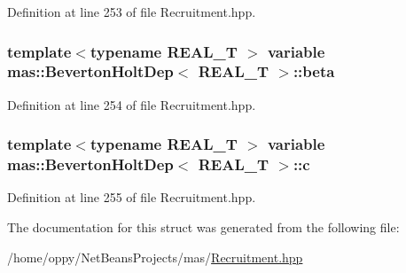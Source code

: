 Definition at line 253 of file Recruitment.\-hpp.

\hypertarget{structmas_1_1_beverton_holt_dep_a35104d09d811c33f724b94dcad050916}{
\subsubsection[{beta}]{\setlength{\rightskip}{0pt plus 5cm}template$<$typename R\-E\-A\-L\-\_\-\-T $>$ {\bf variable} {\bf mas\-::\-Beverton\-Holt\-Dep}$<$ R\-E\-A\-L\-\_\-\-T $>$\-::beta}}\label{structmas_1_1_beverton_holt_dep_a35104d09d811c33f724b94dcad050916}


Definition at line 254 of file Recruitment.\-hpp.

\hypertarget{structmas_1_1_beverton_holt_dep_abe85a3970eb878c0c5fd0f2a4027bb10}{
\subsubsection[{c}]{\setlength{\rightskip}{0pt plus 5cm}template$<$typename R\-E\-A\-L\-\_\-\-T $>$ {\bf variable} {\bf mas\-::\-Beverton\-Holt\-Dep}$<$ R\-E\-A\-L\-\_\-\-T $>$\-::c}}\label{structmas_1_1_beverton_holt_dep_abe85a3970eb878c0c5fd0f2a4027bb10}


Definition at line 255 of file Recruitment.\-hpp.



The documentation for this struct was generated from the following file\-:\begin{DoxyCompactItemize}
\item 
/home/oppy/\-Net\-Beans\-Projects/mas/\hyperlink{_recruitment_8hpp}{Recruitment.\-hpp}\end{DoxyCompactItemize}
